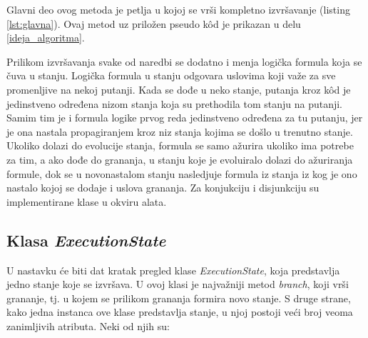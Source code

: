 \documentclass[12pt,oneside]{memoir}
\begin{document}
Glavni deo ovog metoda je petlja u kojoj se vrši kompletno izvršavanje (listing \ref{lst:glavna}). Ovaj metod uz priložen pseudo k\^od je prikazan u delu \ref{ideja_algoritma}.

Prilikom izvršavanja svake od naredbi se dodatno i menja logička formula koja se čuva u stanju. Logička formula u stanju odgovara uslovima koji važe za sve promenljive na nekoj putanji. Kada se dođe u neko stanje, putanja kroz k\^od je jedinstveno određena nizom stanja koja su prethodila tom stanju na putanji. Samim tim je i formula logike prvog reda jedinstveno određena za tu putanju, jer je ona nastala propagiranjem kroz niz stanja kojima se došlo u trenutno stanje. Ukoliko dolazi do evolucije stanja, formula se samo ažurira ukoliko ima potrebe za tim, a ako dođe do grananja, u stanju koje je evoluiralo dolazi do ažuriranja formule, dok se u novonastalom stanju nasledjuje formula iz stanja iz kog je ono nastalo kojoj se dodaje i uslova grananja. Za konjukciju i disjunkciju su implementirane klase u okviru alata.    
    
\subsection{Klasa \textit{ExecutionState}}
U nastavku će biti dat kratak pregled klase \textit{ExecutionState}, koja predstavlja jedno stanje koje se izvršava. U ovoj klasi je najvažniji metod \textit{branch}, koji vrši grananje, tj. u kojem se prilikom grananja formira novo stanje. S druge strane, kako jedna instanca ove klase predstavlja stanje, u njoj postoji veći broj veoma zanimljivih atributa. Neki od njih su:
\end{document}
